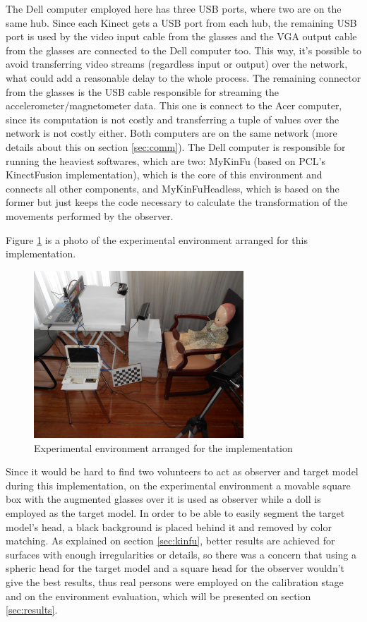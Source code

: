 \documentclass[msc, a4paper, classic, en]{ufbathesis}
\begin{document}
The Dell computer employed here has three USB ports, where two are on the same hub. Since each Kinect gets a USB port from each hub, the remaining USB port is used by the video input cable from the glasses and the VGA output cable from the glasses are connected to the Dell computer too. This way, it's possible to avoid transferring video streams (regardless input or output) over the network, what could add a reasonable delay to the whole process. The remaining connector from the glasses is the USB cable responsible for streaming the accelerometer/magnetometer data. This one is connect to the Acer computer, since its computation is not costly and transferring a tuple of values over the network is not costly either. Both computers are on the same network (more details about this on section \ref{sec:comm}). The Dell computer is responsible for running the heaviest softwares, which are two: MyKinFu (based on PCL's KinectFusion implementation), which is the core of this environment and connects all other components, and MyKinFuHeadless, which is based on the former but just keeps the code necessary to calculate the transformation of the movements performed by the observer.

Figure \ref{fig:expenv} is a photo of the experimental environment arranged for this implementation.

\begin{figure}
\centering
\includegraphics[width=0.7\textwidth]{images/expenv.jpg}
\caption{Experimental environment arranged for the implementation}
\label{fig:expenv}
\end{figure}

Since it would be hard to find two volunteers to act as observer and target model during this implementation, on the experimental environment a movable square box with the augmented glasses over it is used as observer while a doll is employed as the target model. In order to be able to easily segment the target model's head, a black background is placed behind it and removed by color matching. As explained on section \ref{sec:kinfu}, better results are achieved for surfaces with enough irregularities or details, so there was a concern that using a spheric head for the target model and a square head for the observer wouldn't give the best results, thus real persons were employed on the calibration stage and on the environment evaluation, which will be presented on section \ref{sec:results}.
\end{document}
